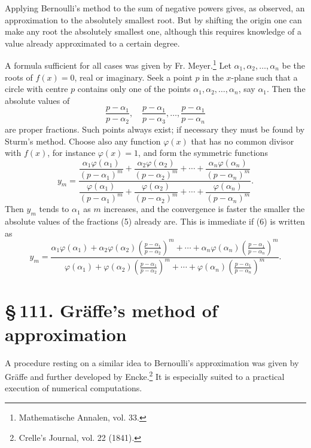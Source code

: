 \documentclass[11pt]{article}
\providecommand{\sect}[2]{\section*{\S\,#1. #2}}
\begin{document}
Applying Bernoulli's method to the sum of negative powers gives, as observed, an approximation to the absolutely smallest root. But by shifting the origin one can make any root the absolutely smallest one, although this requires knowledge of a value already approximated to a certain degree.

A formula sufficient for all cases was given by Fr. Meyer.\footnote{Mathematische Annalen, vol. 33.} Let $\alpha_1,\alpha_2,\ldots,\alpha_n$ be the roots of $f(x)=0$, real or imaginary. Seek a point $p$ in the $x$-plane such that a circle with centre $p$ contains only one of the points $\alpha_1,\alpha_2,\ldots,\alpha_n$, say $\alpha_1$. Then the absolute values of
\begin{equation}
        \frac{p-\alpha_1}{p-\alpha_2},\quad
        \frac{p-\alpha_1}{p-\alpha_3},\ldots,
        \frac{p-\alpha_1}{p-\alpha_n}
\tag{5}
\end{equation}
are proper fractions. Such points always exist; if necessary they must be found by Sturm's method. Choose also any function $\varphi(x)$ that has no common divisor with $f(x)$, for instance $\varphi(x)=1$, and form the symmetric functions
\begin{equation}
y_m=
\frac{\dfrac{\alpha_1\varphi(\alpha_1)}{(p-\alpha_1)^m}
+\dfrac{\alpha_2\varphi(\alpha_2)}{(p-\alpha_2)^m}+\cdots+
\dfrac{\alpha_n\varphi(\alpha_n)}{(p-\alpha_n)^m}}
{\dfrac{\varphi(\alpha_1)}{(p-\alpha_1)^m}
+\dfrac{\varphi(\alpha_2)}{(p-\alpha_2)^m}+\cdots+
\dfrac{\varphi(\alpha_n)}{(p-\alpha_n)^m}}.
\tag{6}
\end{equation}
Then $y_m$ tends to $\alpha_1$ as $m$ increases, and the convergence is faster the smaller the absolute values of the fractions (5) already are. This is immediate if (6) is written as
\[
y_m=
\frac{\alpha_1\varphi(\alpha_1)+
\alpha_2\varphi(\alpha_2)\left(\frac{p-\alpha_1}{p-\alpha_2}\right)^m
+\cdots+
\alpha_n\varphi(\alpha_n)\left(\frac{p-\alpha_1}{p-\alpha_n}\right)^m}
{\varphi(\alpha_1)+
\varphi(\alpha_2)\left(\frac{p-\alpha_1}{p-\alpha_2}\right)^m
+\cdots+
\varphi(\alpha_n)\left(\frac{p-\alpha_1}{p-\alpha_n}\right)^m}.
\]

\sect{111}{Gräffe's method of approximation}

A procedure resting on a similar idea to Bernoulli's approximation was given by Gräffe and further developed by Encke.\footnote{Crelle's Journal, vol. 22 (1841).} It is especially suited to a practical execution of numerical computations.
\end{document}
